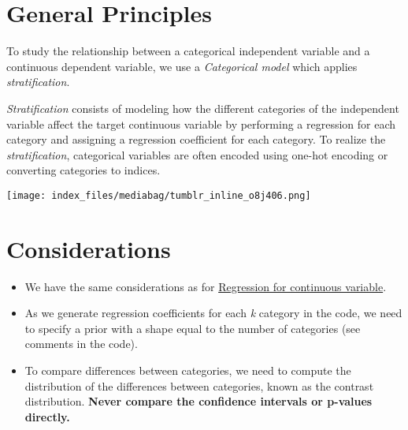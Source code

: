 \documentclass[
  letterpaper,
  DIV=11,
  numbers=noendperiod]{scrreprt}
\begin{document}
\section{General Principles}\label{general-principles-3}

To study the relationship between a categorical independent variable and
a continuous dependent variable, we use a \emph{Categorical model} which
applies \emph{stratification}.

\emph{Stratification} consists of modeling how the different categories
of the independent variable affect the target continuous variable by
performing a regression for each category and assigning a regression
coefficient for each category. To realize the \emph{stratification},
categorical variables are often encoded using one-hot encoding or
converting categories to indices.

\texttt{[image: index\_files/mediabag/tumblr\_inline\_o8j406.png]}

\section{Considerations}\label{considerations-3}

\begin{tcolorbox}[enhanced jigsaw, toptitle=1mm, opacityback=0, titlerule=0mm, breakable, bottomrule=.15mm, colframe=quarto-callout-caution-color-frame, arc=.35mm, coltitle=black, left=2mm, opacitybacktitle=0.6, leftrule=.75mm, toprule=.15mm, rightrule=.15mm, bottomtitle=1mm, colbacktitle=quarto-callout-caution-color!10!white, title=\textcolor{quarto-callout-caution-color}{\faFire}\hspace{0.5em}{Caution}, colback=white]

\begin{itemize}
\item
  We have the same considerations as for
  \href{1.\%20Linear\%20Regression\%20for\%20continuous\%20variable.qmd}{Regression
  for continuous variable}.
\item
  As we generate regression coefficients for each \emph{k} category in
  the code, we need to specify a prior with a shape equal to the number
  of categories (see comments in the code).
\item
  To compare differences between categories, we need to compute the
  distribution of the differences between categories, known as the
  contrast distribution. \textbf{Never compare the confidence intervals
  or p-values directly.}
\end{itemize}

\end{tcolorbox}
\end{document}
